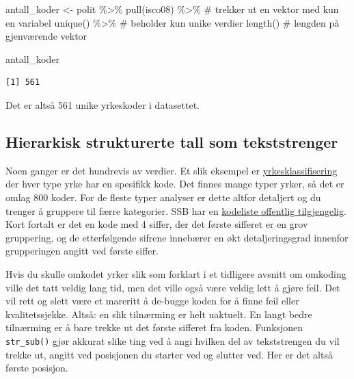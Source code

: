 \documentclass[
  letterpaper,
  DIV=11,
  numbers=noendperiod]{scrreprt}
\newenvironment{Shaded}{\begin{snugshade}}{\end{snugshade}}
\newcommand{\CommentTok}[1]{\textcolor[rgb]{0.37,0.37,0.37}{#1}}
\newcommand{\FunctionTok}[1]{\textcolor[rgb]{0.28,0.35,0.67}{#1}}
\newcommand{\NormalTok}[1]{\textcolor[rgb]{0.00,0.23,0.31}{#1}}
\newcommand{\OtherTok}[1]{\textcolor[rgb]{0.00,0.23,0.31}{#1}}
\newcommand{\SpecialCharTok}[1]{\textcolor[rgb]{0.37,0.37,0.37}{#1}}
\theoremstyle{definition}
\theoremstyle{remark}
\begin{document}
\begin{Shaded}
\begin{Highlighting}[]
\NormalTok{antall\_koder }\OtherTok{\textless{}{-}}\NormalTok{ polit }\SpecialCharTok{\%\textgreater{}\%}  
  \FunctionTok{pull}\NormalTok{(isco08) }\SpecialCharTok{\%\textgreater{}\%}   \CommentTok{\# trekker ut en vektor med kun en variabel }
  \FunctionTok{unique}\NormalTok{() }\SpecialCharTok{\%\textgreater{}\%}       \CommentTok{\# beholder kun unike verdier }
  \FunctionTok{length}\NormalTok{()           }\CommentTok{\# lengden på gjenværende vektor }

\NormalTok{antall\_koder}
\end{Highlighting}
\end{Shaded}

\begin{verbatim}
[1] 561
\end{verbatim}

Det er altså 561 unike yrkeskoder i datasettet.

\hypertarget{hierarkisk-strukturerte-tall-som-tekststrenger}{%
\subsection{Hierarkisk strukturerte tall som
tekststrenger}\label{hierarkisk-strukturerte-tall-som-tekststrenger}}

Noen ganger er det hundrevis av verdier. Et slik eksempel er
\href{http://www.ilo.org/public/english/bureau/stat/isco/isco88/major.htm}{yrkesklassifisering}
der hver type yrke har en spesifikk kode. Det finnes mange typer yrker,
så det er omlag 800 koder. For de fleste typer analyser er dette altfor
detaljert og du trenger å gruppere til færre kategorier. SSB har en
\href{https://www.ssb.no/arbeid-og-lonn/sysselsetting/artikler/yrkeskatalogen}{kodeliste
offentlig tilgjengelig}. Kort fortalt er det en kode med 4 siffer, der
det første sifferet er en grov gruppering, og de etterfølgende sifrene
innebærer en økt detaljeringsgrad innenfor grupperingen angitt ved
første siffer.

Hvis du skulle omkodet yrker slik som forklart i et tidligere avsnitt om
omkoding ville det tatt veldig lang tid, men det ville også være veldig
lett å gjøre feil. Det vil rett og slett være et mareritt å de-bugge
koden for å finne feil eller kvalitetssjekke. Altså: en slik tilnærming
er helt uaktuelt. En langt bedre tilnærming er å bare trekke ut det
første sifferet fra koden. Funksjonen \texttt{str\_sub()} gjør akkurat
slike ting ved å angi hvilken del av tekststrengen du vil trekke ut,
angitt ved posisjonen du starter ved og slutter ved. Her er det altså
første posisjon.
\end{document}
